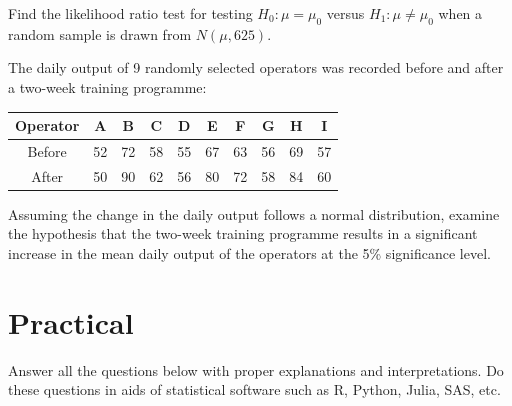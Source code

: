 \begin{mdframed}
    \begin{Exercise}
        Find the likelihood ratio test for testing $H_0:\mu = \mu_0$ versus 
        $H_1:\mu \neq \mu_0$ when a random sample is drawn from 
        $N(\mu, 625)$.
    \end{Exercise}

    \begin{Exercise}
        The daily output of 9 randomly selected operators was recorded before and after a two-week 
        training programme:

        \begin{center}
            \begin{tabular}{c|ccccccccc}
                Operator & A & B & C & D & E & F & G & H & I\\
                \hline
                Before & 52 & 72 & 58 & 55 & 67 & 63 & 56 & 69 & 57\\
                After & 50 & 90 & 62 & 56 & 80 & 72 & 58 & 84 & 60\\
            \end{tabular}
        \end{center}

        Assuming the change in the daily output follows a normal distribution, examine the 
        hypothesis that the two-week training programme results in a significant increase in the 
        mean daily output of the operators at the 5\% significance level.
    \end{Exercise}
\end{mdframed}

\section*{Practical}

Answer all the questions below with proper explanations and interpretations.
Do these questions in aids of statistical software such as R, Python, Julia, SAS, etc.

